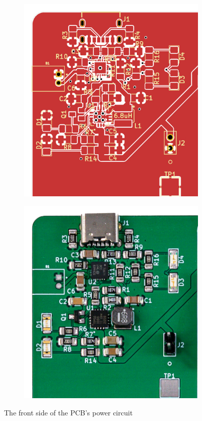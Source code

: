 \begin{figure}[t]
  \centering
  \begin{subfigure}{.5\textwidth}
    \centering
    \includegraphics[width=.75\linewidth]{Figures/kicad/close-ups/power-front}
  \end{subfigure}%
  \begin{subfigure}{.5\textwidth}
    \centering
    \includegraphics[width=.75\linewidth]{Figures/pcb/crops/power}
  \end{subfigure}
  \caption[PCB Power Circuit]{The front side of the PCB's power circuit}
  \label{fig:PowerCircuit}
\end{figure}

